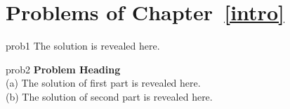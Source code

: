 

\section*{Problems of Chapter~\ref{intro}}

\begin{sol}{prob1}
The solution is revealed here.
\end{sol}

\begin{sol}{prob2}
\textbf{Problem Heading}\\
(a) The solution of first part is revealed here.\\
(b) The solution of second part is revealed here.
\end{sol}
